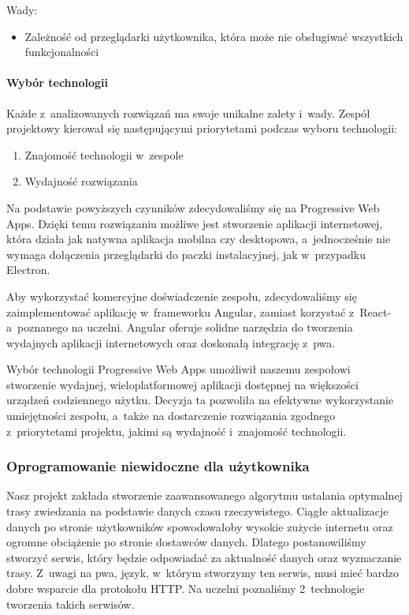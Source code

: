 Wady:
\begin{itemize}
    \item Zależność od przeglądarki użytkownika, która może nie obsługiwać wszystkich funkcjonalności
\end{itemize}

\paragraph{Wybór technologii}
Każde z~analizowanych rozwiązań ma swoje unikalne zalety i~wady.
Zespół projektowy kierował się następującymi priorytetami podczas wyboru technologii:

\begin{enumerate}
    \item Znajomość technologii w~zespole
    \item Wydajność rozwiązania
\end{enumerate}

Na podstawie powyższych czynników zdecydowaliśmy się na Progressive Web Apps.
Dzięki temu rozwiązaniu możliwe jest stworzenie aplikacji internetowej, która działa jak natywna aplikacja mobilna czy desktopowa, a~jednocześnie nie wymaga dołączenia przeglądarki do paczki instalacyjnej, jak w~przypadku Electron.

Aby wykorzystać komercyjne doświadczenie zespołu, zdecydowaliśmy się zaimplementować aplikację w~frameworku Angular, zamiast korzystać z~React-a~poznanego na uczelni.
Angular oferuje solidne narzędzia do tworzenia wydajnych aplikacji internetowych oraz doskonałą integrację z~\acrshort{pwa}.

Wybór technologii Progressive Web Apps umożliwił naszemu zespołowi stworzenie wydajnej, wieloplatformowej aplikacji dostępnej na większości urządzeń codziennego użytku.
Decyzja ta pozwoliła na efektywne wykorzystanie umiejętności zespołu, a~także na dostarczenie rozwiązania zgodnego z~priorytetami projektu, jakimi są wydajność i~znajomość technologii.

\subsubsection{Oprogramowanie niewidoczne dla użytkownika}
Nasz projekt zakłada stworzenie zaawansowanego algorytmu ustalania optymalnej trasy zwiedzania na podstawie danych czasu rzeczywistego.
Ciągłe aktualizacje danych po stronie użytkowników spowodowałoby wysokie zużycie internetu oraz ogromne obciążenie po stronie dostawców danych.
Dlatego postanowiliśmy stworzyć serwis, który będzie odpowiadać za aktualność danych oraz wyznaczanie trasy.
Z~uwagi na \acrshort{pwa}, język, w~którym stworzymy ten serwis, musi mieć bardzo dobre wsparcie dla protokołu HTTP\@.
Na uczelni poznaliśmy 2~technologie tworzenia takich serwisów.

